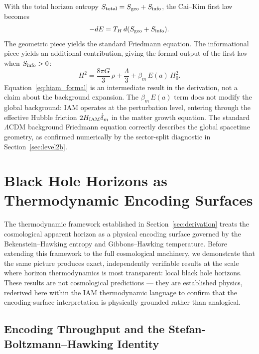 \documentclass[twocolumn,a4paper,aps,prd,twocolumn,showpacs,notitlepage,superscriptaddress,nofootinbib]{article}
\newcommand{\LCDM}{$\Lambda$CDM}
\newcommand{\Ea}{E(a)}
\newcommand{\betam}{\beta_{m}}
\begin{document}
With the total horizon entropy $S_{\rm total} = S_{\rm geo} + S_{\rm info}$,
the Cai--Kim first law becomes
\begin{equation}
  -dE = T_H\,d(S_{\rm geo} + S_{\rm info}).
  \label{eq:modifiedfirstlaw}
\end{equation}
The geometric piece yields the standard Friedmann equation.  The informational
piece yields an additional contribution, giving the formal output of the first
law when $S_{\rm info} > 0$:
\begin{equation}
  H^2 = \frac{8\pi G}{3}\,\rho + \frac{\Lambda}{3} + \betam\,\Ea\,H_0^2.
  \label{eq:hiam_formal}
\end{equation}
Equation~\eqref{eq:hiam_formal} is an intermediate result in the derivation,
not a claim about the background expansion.  The $\betam\,\Ea$ term does not
modify the global background: IAM operates at the perturbation level, entering
through the effective Hubble friction $2H_{\rm IAM}\dot\delta_m$ in the matter
growth equation.  The standard \LCDM{} background Friedmann equation correctly
describes the global spacetime geometry, as confirmed numerically by the
sector-split diagnostic in Section~\ref{sec:level2b}.

\section{Black Hole Horizons as Thermodynamic Encoding Surfaces}
\label{sec:bh_encoding}

The thermodynamic framework established in Section~\ref{sec:derivation} treats
the cosmological apparent horizon as a physical encoding surface governed by
the Bekenstein--Hawking entropy and Gibbons--Hawking temperature.  Before
extending this framework to the full cosmological machinery, we demonstrate
that the same picture produces exact, independently verifiable results at the
scale where horizon thermodynamics is most transparent: local black hole
horizons.  These results are not cosmological predictions --- they are
established physics, rederived here within the IAM thermodynamic language to
confirm that the encoding-surface interpretation is physically grounded rather
than analogical.

\subsection{Encoding Throughput and the Stefan-Boltzmann--Hawking Identity}
\label{sec:sbh_identity}
\end{document}
